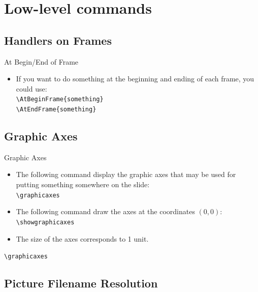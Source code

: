 \documentclass[english,sectioncirclenumberstyle]{ciadbeamer}
\begin{document}
\section{Low-level commands}
\sectiontableofcontentslide

\subsection{Handlers on Frames}

\begin{frame}{At Begin/End of Frame}
	\begin{itemize}
	\item If you want to do something at the beginning and ending of each frame, you could use: \\
		\texttt{{\textbackslash}AtBeginFrame\{something\}} \\
		\texttt{{\textbackslash}AtEndFrame\{something\}}
	\end{itemize}
\end{frame}

\subsection{Graphic Axes}

\begin{frame}{Graphic Axes}
	\begin{itemize}
	\item The following command display the graphic axes that may be used for putting something somewhere on the slide: \\
		\texttt{{\textbackslash}graphicaxes}
	\item The following command draw the axes at the coordinates $(0,0)$: \\
		\texttt{{\textbackslash}showgraphicaxes}
	\item The size of the axes corresponds to 1 unit.
	\end{itemize}
	\begin{example}
		\texttt{{\textbackslash}graphicaxes}\\
		\graphicaxes
	\end{example}
\end{frame}

\subsection{Picture Filename Resolution}
\end{document}
